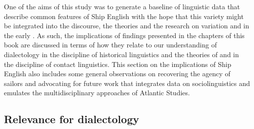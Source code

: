 One of the aims of this study was to generate a baseline of linguistic data that describe common features of Ship English with the hope that this variety might be integrated into the discourse, the theories and the research on  variation and  in the early . As such, the implications of findings presented in the chapters of this book are discussed in terms of how they relate to our understanding of dialectology in the discipline of historical linguistics and the theories of  and  in the discipline of contact linguistics. This section on the implications of Ship English also includes some general observations on recovering the agency of sailors and advocating for future work that integrates data on sociolinguistics and emulates the multidisciplinary approaches of Atlantic Studies.

\subsection{{Relevance for dialectology}}%

